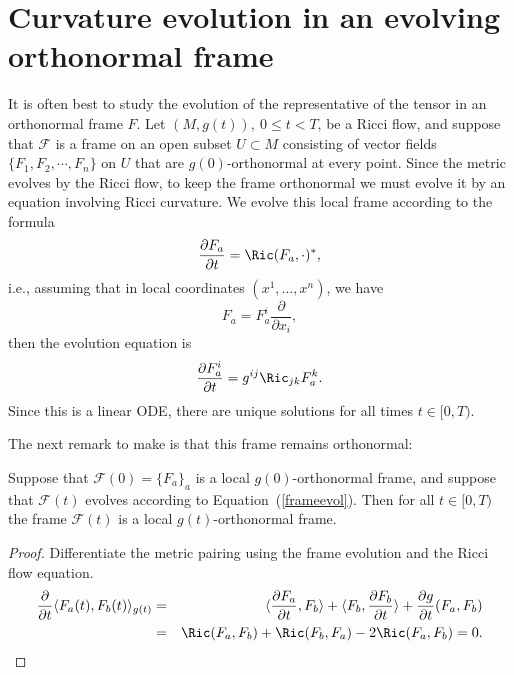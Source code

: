 \section{Curvature evolution in an evolving orthonormal
frame}\label{evolframe}


It is often best to study the evolution of the representative of the
tensor in an orthonormal frame $F$. Let $(M,g(t)),\ 0\le t<T$, be a
Ricci flow, and suppose that ${\mathcal F}$ is a frame on an open
subset $U\subset M$ consisting of vector fields $\{F_{1},
F_{2},\cdots,F_{n}\}$ on $U$ that are $g(0)$-orthonormal at every
point. Since the metric evolves by the Ricci flow, to keep the frame
orthonormal we must evolve it by an equation involving Ricci
curvature. We evolve this local frame  according to the formula
\begin{equation}\label{frameevol} \frac{\partial F_{a}}{\partial t}
= \Ric(F_{a},\cdot)^*,\end{equation} i.e.,  assuming that in local
coordinates $(x^1,\ldots,x^n)$, we have
\[ F_{a}=F^{i}_{a}\frac{\partial}{\partial x_{i}}, \]
then the evolution equation is
\[\frac{\partial F^{i}_{a}}{\partial t} = g^{ij}\Ric_{jk}F^{k}_{a}.\]
 Since this is a linear ODE, there are unique
solutions for all times $t\in [0,T)$.


The next remark to make is that this frame remains orthonormal:

\begin{claim}\label{claim:orthonormal-frame-preservation}
\label{ortho}

 Suppose that ${\mathcal F}(0)=\{F_a\}_a$ is a local  $g(0)$-orthonormal frame,
  and suppose that ${\mathcal F}(t)$ evolves according to Equation~(\ref{frameevol}). Then
 for all $t\in [0,T)$ the frame ${\mathcal F}(t)$ is a local $g(t)$-orthonormal frame.
\end{claim}

\begin{proof}
\sketch Differentiate the metric pairing using the frame evolution and
the Ricci flow equation.
\begin{eqnarray*}
\frac{\partial}{\partial t}\langle F_a(t),F_b(t)\rangle_{g(t)} & = & \langle
\frac{\partial F_a}{\partial t},F_b\rangle + \langle F_b,\frac{\partial
F_b}{\partial t}\rangle +
\frac {\partial g}{\partial t}(F_a,F_b) \\
 & = & \Ric(F_a,F_b)+\Ric(F_b,F_a)-2\Ric(F_a,F_b)=0.
\end{eqnarray*}
\end{proof}

